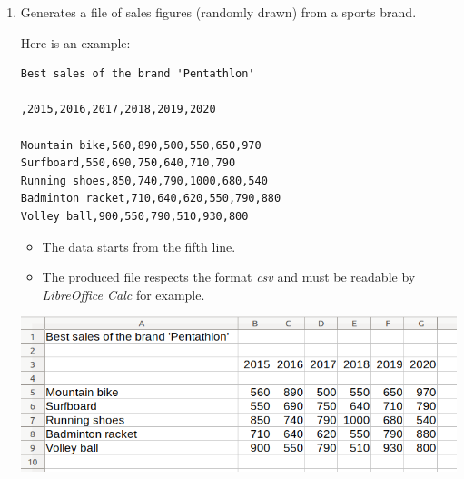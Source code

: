 \documentclass[11pt,class=report,crop=false]{standalone}
\begin{document}



\begin{activite}


\begin{enumerate}
  \item Generates a  file of sales figures (randomly drawn) from a sports brand.
  
Here is an example:
\begin{center}
\begin{minipage}{0.4\textwidth}
\begin{lstlisting}
Best sales of the brand 'Pentathlon'

,2015,2016,2017,2018,2019,2020

Mountain bike,560,890,500,550,650,970
Surfboard,550,690,750,640,710,790
Running shoes,850,740,790,1000,680,540
Badminton racket,710,640,620,550,790,880
Volley ball,900,550,790,510,930,800
\end{lstlisting}
\end{minipage}
\end{center}

\begin{itemize}
  \item The data starts from the fifth line.
  \item The produced file respects the format \emph{csv} and must be readable by
   \emph{LibreOffice Calc} for example.
\end{itemize}

\begin{center}
\includegraphics[scale=\myscale,scale=0.45]{screen-files-2b-en}
\end{center} 


\end{enumerate}
\end{activite}
\end{document}
